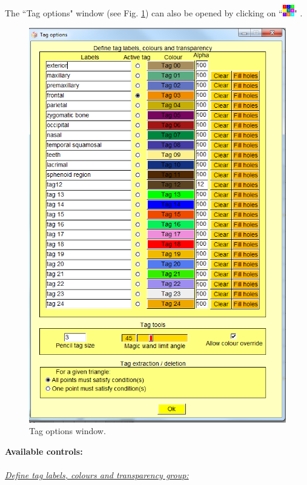 The ``Tag options" window (see Fig. \ref{tag_options_window}) can also be opened by clicking on ``\includegraphics[scale=0.7]{images/pixmap/Show_Tag_Window2.png}" .
\begin{figure}
  \centering
  \includegraphics[scale=0.5]{images/Tags/Tags.png} 
	\caption{Tag options window.}
\label{tag_options_window}
 
\end{figure}
\noindent
\textbf{Available controls:}\\
\\
\noindent
\textit{\underline{Define tag labels, colours and transparency group:}}\\
